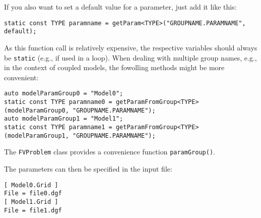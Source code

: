 If you also want to set a default value for a parameter, just add it like this:

\begin{lstlisting}[name=propsyscars,style=DumuxCode]
static const TYPE paramname = getParam<TYPE>("GROUPNAME.PARAMNAME", default);
\end{lstlisting}

As this function call is relatively expensive, the respective variables should always be \texttt{static} (e.g., if used in a loop). When dealing with multiple group names, e.g., in the context of coupled models, the fowolling methods might be more convenient:

\begin{lstlisting}[name=propsyscars,style=DumuxCode]
auto modelParamGroup0 = "Model0";
static const TYPE paramname0 = getParamFromGroup<TYPE>(modelParamGroup0, "GROUPNAME.PARAMNAME");
auto modelParamGroup1 = "Model1";
static const TYPE paramname1 = getParamFromGroup<TYPE>(modelParamGroup1, "GROUPNAME.PARAMNAME");
\end{lstlisting}

The \texttt{FVProblem} class provides a convenience function \texttt{paramGroup()}.

The parameters can then be specified in the input file:

\begin{lstlisting}[style=Bash]
[ Model0.Grid ]
File = file0.dgf
[ Model1.Grid ]
File = file1.dgf
\end{lstlisting}
